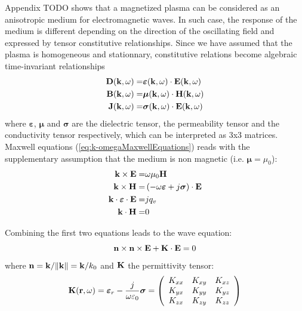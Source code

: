 Appendix TODO shows that a magnetized plasma can be considered as an anisotropic medium for electromagnetic waves.  In such case, the response of the medium is different depending on the direction of the oscillating field and expressed by tensor constitutive relationships. Since we have assumed that the plasma is homogeneous and stationnary, constitutive relations become algebraic time-invariant relationships%
\begin{subequations}
	\begin{align}
		{\mathbf D}({\mathbf k}, \omega) 
		=& 
		\boldsymbol{\varepsilon}({\mathbf k}, \omega) \cdot {\mathbf E}({\mathbf k}, \omega) 
		\label{eq:disp_relation_kw_D}
		\\
		{\mathbf B}({\mathbf k}, \omega) 
		=& 
		\boldsymbol{\mu}({\mathbf k}, \omega) \cdot {\mathbf H}({\mathbf k}, \omega) 
		\label{eq:disp_relation_kw_B}
		\\
		{\mathbf J}({\mathbf k}, \omega) 
		=& 
		\boldsymbol{\sigma}({\mathbf k}, \omega) \cdot {\mathbf E}({\mathbf k}, \omega) 
		\label{eq:disp_relation_kw_J}
	\end{align}
	\label{eq:k-omegaDispersionRelation}
\end{subequations}
where $\boldsymbol{\varepsilon}$, $\boldsymbol{\mu}$ and $\boldsymbol{\sigma}$ are the dielectric tensor, the permeability tensor and the conductivity tensor respectively, which can be interpreted as 3x3 matrices. Maxwell equations (\ref{eq:k-omegaMaxwellEquations}) reads with the supplementary assumption that the medium is non magnetic (i.e. $\boldsymbol{\mu}=\mu_0$):
\begin{subequations}
	\begin{align}
		{\mathbf k} \times {\mathbf E}  
		=& 
		\omega \mu_0 {\mathbf H}
		\\
		{\mathbf k} \times {\mathbf H} 
		=& 
		\left(
		-\omega \boldsymbol{\varepsilon} 
		+ 	
		j\boldsymbol{\sigma} 
		\right) \cdot 
		{\mathbf E}
		\\
		{\mathbf k}  \cdot \boldsymbol{\varepsilon}  \cdot {\mathbf E} 
		=& jq_v
		\\
		{\mathbf k}  \cdot {\mathbf H} 
		=& 0	
	\end{align}
\end{subequations}

Combining the first two equations leads to the wave equation:
\begin{equation}
{\mathbf n} \times {\mathbf n} \times {\mathbf E} + {\mathbf K} \cdot {\mathbf E} = 0
\end{equation}
where ${\mathbf n} = {\mathbf k} / \norm{{\mathbf k}} = {\mathbf k}/k_0$ and ${\mathbf K}$ the permittivity tensor:
\begin{equation}
{\mathbf K}({\mathbf r}, \omega) =  
\boldsymbol{\varepsilon}_r - \frac{j}{\omega \varepsilon_0} \boldsymbol{\sigma}
=
\left(
\begin{array}{ccc}
K_{xx} & K_{xy} & K_{xz} \\
K_{yx} & K_{yy} & K_{yz} \\
K_{zx} & K_{zy} & K_{zz} \\
\end{array}
\right)
\end{equation}  

